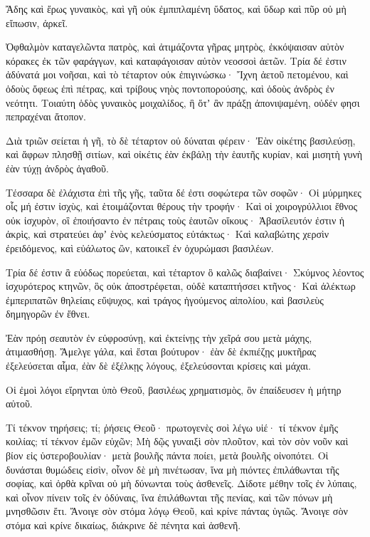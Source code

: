 {Ἄδης καὶ ἔρως γυναικὸς, καὶ γῆ οὐκ ἐμπιπλαμένη ὕδατος, καὶ ὕδωρ καὶ πῦρ οὐ μὴ εἴπωσιν, ἀρκεῖ.
\par }{\PP {}Ὀφθαλμὸν καταγελῶντα πατρὸς, καὶ ἀτιμάζοντα γῆρας μητρὸς, ἐκκόψαισαν αὐτὸν κόρακες ἐκ τῶν φαράγγων, καὶ καταφάγοισαν αὐτὸν νεοσσοὶ ἀετῶν.
Τρία δέ ἐστιν ἀδύνατά μοι νοῆσαι, καὶ τὸ τέταρτον οὐκ ἐπιγινώσκω·
Ἴχνη ἀετοῦ πετομένου, καὶ ὁδοὺς ὄφεως ἐπὶ πέτρας, καὶ τρίβους νηὸς ποντοπορούσης, καὶ ὁδοὺς ἀνδρὸς ἐν νεότητι.
Τοιαύτη ὁδὸς γυναικὸς μοιχαλίδος, ἣ ὅτʼ ἂν πράξῃ ἀπονιψαμένη, οὐδέν φησι πεπραχέναι ἄτοπον.
\par }{\PP {}Διὰ τριῶν σείεται ἡ γῆ, τὸ δὲ τέταρτον οὐ δύναται φέρειν·
Ἐὰν οἰκέτης βασιλεύσῃ, καὶ ἄφρων πλησθῇ σιτίων,
καὶ οἰκέτις ἐὰν ἐκβάλῃ τὴν ἑαυτῆς κυρίαν, καὶ μισητὴ γυνὴ ἐὰν τύχῃ ἀνδρὸς ἀγαθοῦ.
\par }{\PP {}Τέσσαρα δὲ ἐλάχιστα ἐπὶ τῆς γῆς, ταῦτα δέ ἐστι σοφώτερα τῶν σοφῶν·
Οἱ μύρμηκες οἷς μή ἐστιν ἰσχὺς, καὶ ἑτοιμάζονται θέρους τὴν τροφήν·
Καὶ οἱ χοιρογρύλλιοι ἔθνος οὐκ ἰσχυρὸν, οἳ ἐποιήσαντο ἐν πέτραις τοὺς ἑαυτῶν οἴκους·
Ἀβασίλευτόν ἐστιν ἡ ἀκρὶς, καὶ στρατεύει ἀφʼ ἑνὸς κελεύσματος εὐτάκτως·
Καὶ καλαβώτης χερσὶν ἐρειδόμενος, καὶ εὐάλωτος ὢν, κατοικεῖ ἐν ὀχυρώμασι βασιλέων.
\par }{\PP {}Τρία δέ ἐστιν ἃ εὐόδως πορεύεται, καὶ τέταρτον ὃ καλῶς διαβαίνει·
Σκύμνος λέοντος ἰσχυρότερος κτηνῶν, ὃς οὐκ ἀποστρέφεται, οὐδὲ καταπτήσσει κτῆνος·
Καὶ ἀλέκτωρ ἐμπεριπατῶν θηλείαις εὔψυχος, καὶ τράγος ἡγούμενος αἰπολίου, καὶ βασιλεὺς δημηγορῶν ἐν ἔθνει.
\par }{\PP {}Ἐὰν πρόῃ σεαυτὸν ἐν εὐφροσύνῃ, καὶ ἐκτείνῃς τὴν χεῖρά σου μετὰ μάχης, ἀτιμασθήσῃ.
Ἄμελγε γάλα, καὶ ἔσται βούτυρον· ἐὰν δὲ ἐκπιέζῃς μυκτῆρας ἐξελεύσεται αἷμα, ἐὰν δὲ ἐξέλκῃς λόγους, ἐξελεύσονται κρίσεις καὶ μάχαι.
\par }{\PP {}Οἱ ἐμοὶ λόγοι εἴρηνται ὑπὸ Θεοῦ, βασιλέως χρηματισμὸς, ὃν ἐπαίδευσεν ἡ μήτηρ αὐτοῦ.
\par }{\PP {}Τί τέκνον τηρήσεις; τί; ῥήσεις Θεοῦ· πρωτογενὲς σοὶ λέγω υἱέ· τί τέκνον ἐμῆς κοιλίας; τί τέκνον ἐμῶν εὐχῶν;
Μὴ δῷς γυναιξὶ σὸν πλοῦτον, καὶ τὸν σὸν νοῦν καὶ βίον εἰς ὑστεροβουλίαν·
μετὰ βουλῆς πάντα ποίει, μετὰ βουλῆς οἰνοπότει. Οἱ δυνάσται θυμώδεις εἰσὶν, οἶνον δὲ μὴ πινέτωσαν,
ἵνα μὴ πιόντες ἐπιλάθωνται τῆς σοφίας, καὶ ὀρθὰ κρῖναι οὐ μὴ δύνωνται τοὺς ἀσθενεῖς.
Δίδοτε μέθην τοῖς ἐν λύπαις, καὶ οἶνον πίνειν τοῖς ἐν ὀδύναις,
ἵνα ἐπιλάθωνται τῆς πενίας, καὶ τῶν πόνων μὴ μνησθῶσιν ἔτι.
Ἄνοιγε σὸν στόμα λόγῳ Θεοῦ, καὶ κρίνε πάντας ὑγιῶς.
Ἄνοιγε σὸν στόμα καὶ κρίνε δικαίως, διάκρινε δὲ πένητα καὶ ἀσθενῆ.

}
